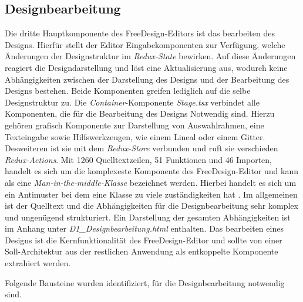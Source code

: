 \subsection{Designbearbeitung}
Die dritte Hauptkomponente des FreeDesign-Editors ist das bearbeiten des Designs. Hierfür stellt der Editor Eingabekomponenten zur Verfügung, welche Änderungen der Designstruktur im \emph{Redux-State} bewirken. Auf diese Änderungen reagiert die Designdarstellung und löst eine Aktualisierung aus, wodurch keine Abhängigkeiten zwischen der Darstellung des Designs und der Bearbeitung des Designs bestehen. Beide Komponenten greifen lediglich auf die selbe Designstruktur zu.  
Die \emph{Container}-Komponente \emph{Stage.tsx} verbindet alle Komponenten, die für die Bearbeitung des Designs Notwendig sind. Hierzu gehören grafisch Komponente zur Darstellung von Auswahlrahmen, eine Texteingabe sowie Hilfswerkzeugen, wie einem Lineal oder einem Gitter. 
Desweiteren ist sie mit dem \emph{Redux-Store} verbunden und ruft sie verschieden \emph{Redux-Actions}. 
Mit  1260 Quelltextzeilen, 51 Funktionen und 46 Importen, handelt es sich um die komplexeste Komponente des FreeDesign-Editor und kann als eine \emph{Man-in-the-middle-Klasse} bezeichnet werden. Hierbei handelt es sich um ein Antimuster bei dem eine Klasse zu viele zuständigkeiten hat \autocite[vgl.][619]{Geirhos2015}.
Im allgemeinen ist der Quelltext und die Abhängigkeiten für die Designbearbeitung sehr komplex und ungenügend strukturiert. 
Ein Darstellung der gesamten Abhängigkeiten ist im Anhang unter \emph{D1\_Designbearbeitung.html} enthalten.
Das bearbeiten eines Designs ist die Kernfunktionalität des FreeDesign-Editor und sollte von einer Soll-Architektur aus der restlichen Anwendung als entkoppelte Komponente extrahiert werden. 



Folgende Bausteine wurden identifiziert, für die Designbearbeitung notwendig sind.
\begin{multicols}{2}    
    
\end{multicols}
